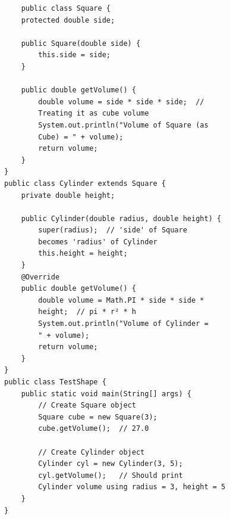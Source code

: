 \begin{verbatim}
    public class Square {
    protected double side;

    public Square(double side) {
        this.side = side;
    }

    public double getVolume() {
        double volume = side * side * side;  // 
        Treating it as cube volume
        System.out.println("Volume of Square (as 
        Cube) = " + volume);
        return volume;
    }
}
public class Cylinder extends Square {
    private double height;

    public Cylinder(double radius, double height) {
        super(radius);  // 'side' of Square 
        becomes 'radius' of Cylinder
        this.height = height;
    }
    @Override
    public double getVolume() {
        double volume = Math.PI * side * side * 
        height;  // pi * r² * h
        System.out.println("Volume of Cylinder = 
        " + volume);
        return volume;
    }
}
public class TestShape {
    public static void main(String[] args) {
        // Create Square object
        Square cube = new Square(3);
        cube.getVolume();  // 27.0

        // Create Cylinder object
        Cylinder cyl = new Cylinder(3, 5);
        cyl.getVolume();   // Should print 
        Cylinder volume using radius = 3, height = 5
    }
}
\end{verbatim}